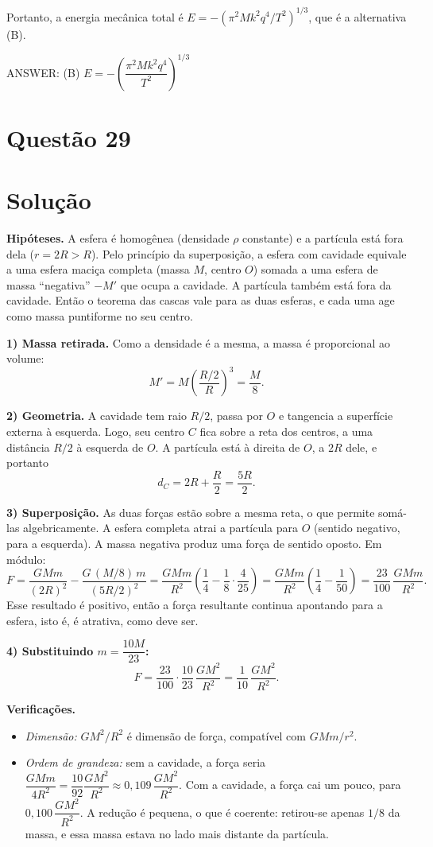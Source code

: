 \documentclass{article}%
\begin{document}
Portanto, a energia mecânica total é $E=-\left(\pi^2Mk^2q^4/T^2\right)^{1/3}$, que é a alternativa (B).

ANSWER: (B) $E=-\left(\dfrac{\pi^2 M k^2 q^4}{T^2}\right)^{1/3}$%
\newpage%
\section*{Questão 29}

\section*{Solução}

\textbf{Hipóteses.} A esfera é homogênea (densidade $\rho$ constante) e a partícula está fora dela ($r = 2R > R$). Pelo princípio da superposição, a esfera com cavidade equivale a uma esfera maciça completa (massa $M$, centro $O$) somada a uma esfera de massa ``negativa'' $-M'$ que ocupa a cavidade. A partícula também está fora da cavidade. Então o teorema das cascas vale para as duas esferas, e cada uma age como massa puntiforme no seu centro.

\textbf{1) Massa retirada.} Como a densidade é a mesma, a massa é proporcional ao volume:
\[
M' = M\left(\frac{R/2}{R}\right)^{3} = \frac{M}{8}.
\]

\textbf{2) Geometria.} A cavidade tem raio $R/2$, passa por $O$ e tangencia a superfície externa à esquerda. Logo, seu centro $C$ fica sobre a reta dos centros, a uma distância $R/2$ à esquerda de $O$. A partícula está à direita de $O$, a $2R$ dele, e portanto
\[
d_C = 2R + \frac{R}{2} = \frac{5R}{2}.
\]

\textbf{3) Superposição.} As duas forças estão sobre a mesma reta, o que permite somá-las algebricamente. A esfera completa atrai a partícula para $O$ (sentido negativo, para a esquerda). A massa negativa produz uma força de sentido oposto. Em módulo:
\[
F = \frac{GMm}{(2R)^2} - \frac{G\,(M/8)\,m}{(5R/2)^2}
  = \frac{GMm}{R^2}\left(\frac{1}{4} - \frac{1}{8}\cdot\frac{4}{25}\right)
  = \frac{GMm}{R^2}\left(\frac{1}{4} - \frac{1}{50}\right)
  = \frac{23}{100}\,\frac{GMm}{R^2}.
\]
Esse resultado é positivo, então a força resultante continua apontando para a esfera, isto é, é atrativa, como deve ser.

\textbf{4) Substituindo $m = \dfrac{10M}{23}$:}
\[
F = \frac{23}{100}\cdot\frac{10}{23}\,\frac{GM^2}{R^2} = \frac{1}{10}\,\frac{GM^2}{R^2}.
\]

\textbf{Verificações.}
\begin{itemize}
\item \emph{Dimensão:} $GM^2/R^2$ é dimensão de força, compatível com $GMm/r^2$.
\item \emph{Ordem de grandeza:} sem a cavidade, a força seria $\dfrac{GMm}{4R^2} = \dfrac{10}{92}\dfrac{GM^2}{R^2} \approx 0{,}109\,\dfrac{GM^2}{R^2}$. Com a cavidade, a força cai um pouco, para $0{,}100\,\dfrac{GM^2}{R^2}$. A redução é pequena, o que é coerente: retirou-se apenas $1/8$ da massa, e essa massa estava no lado mais distante da partícula.
\end{itemize}
\end{document}
